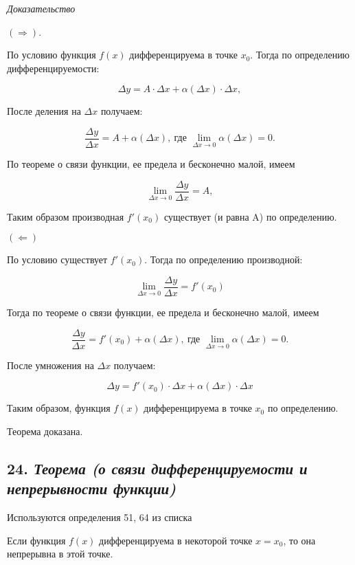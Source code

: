 \textit{Доказательство}

$(\Rightarrow)$.

По условию функция $f(x)$ дифференцируема в точке $x_0$. Тогда по определению дифференцируемости:

$$\Delta y  = A \cdot \Delta x + \alpha(\Delta x)\cdot \Delta x,$$

После деления на $\Delta x$ получаем:

$$
\dfrac{\Delta y}{\Delta x}
= A + \alpha(\Delta x), \ \text{где } \lim\limits_{\Delta x \rightarrow 0}\alpha(\Delta x) = 0.
$$

По теореме о связи функции, ее предела и бесконечно малой, имеем

$$
\lim\limits_{\Delta x \rightarrow 0}\dfrac{\Delta y}{\Delta x} = A,
$$

Таким образом производная $f'(x_0)$ существует (и равна A) по определению.

$(\Leftarrow)$

По условию существует $f'(x_0)$. Тогда по определению производной:

$$
\lim\limits_{\Delta x \rightarrow 0}\dfrac{\Delta y}{\Delta x} = f'(x_0)
$$

Тогда по теореме о связи функции, ее предела и бесконечно малой, имеем

$$
\dfrac{\Delta y}{\Delta x} = f'(x_0) + \alpha(\Delta x), \ \text{где } \lim\limits_{\Delta x \rightarrow 0}\alpha(\Delta x) = 0.
$$

После умножения на $\Delta x$ получаем:

$$
\Delta y = f'(x_0)\cdot \Delta x + \alpha(\Delta x)\cdot \Delta x
$$

Таким образом, функция $f(x)$ дифференцируема в точке $x_0$ по определению.

Теорема доказана.
\newpage 
\subsection*{24. \textit{Теорема (о связи дифференцируемости и непрерывности функции)}}
\begin{Quote2} 
\small\centering 

Используются определения 51, 64 из списка \end{Quote2} 

Если функция $f(x)$ дифференцируема в некоторой точке $x = x_0$, то она непрерывна в этой точке.
\vspace*{20pt} 

